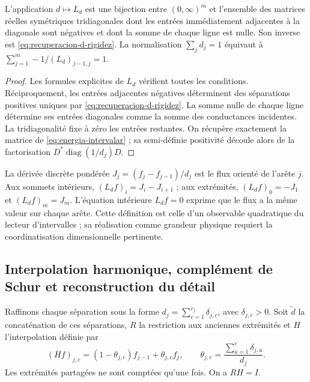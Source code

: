 \begin{proposition}
\label{prop:energia-bidireccional}
L'application \(d\mapsto L_d\) est une bijection entre \((0,\infty)^m\) et l'ensemble des matrices réelles symétriques tridiagonales dont les entrées immédiatement adjacentes à la diagonale sont négatives et dont la somme de chaque ligne est nulle. Son inverse est \eqref{eq:recuperacion-d-rigidez}. La normalisation \(\sum_jd_j=1\) équivaut à \(\sum_{j=1}^m-1/(L_d)_{j-1,j}=1\).
\end{proposition}
\begin{proof}
Les formules explicites de \(L_d\) vérifient toutes les conditions.
Réciproquement, les entrées adjacentes négatives déterminent des séparations
positives uniques par \eqref{eq:recuperacion-d-rigidez}. La somme nulle de
chaque ligne détermine ses entrées diagonales comme la somme des
conductances incidentes. La tridiagonalité fixe à zéro les entrées
restantes. On récupère exactement la matrice de
\eqref{eq:energia-intervalar} ; sa semi-définie positivité découle alors
de la factorisation \(D^*\operatorname{diag}(1/d_j)D\).
\end{proof}

La dérivée discrète pondérée \(J_j=(f_j-f_{j-1})/d_j\) est le flux orienté de l'arête \(j\). Aux sommets intérieurs, \((L_df)_i=J_i-J_{i+1}\) ; aux extrémités, \((L_df)_0=-J_1\) et \((L_df)_m=J_m\). L'équation intérieure \(L_df=0\) exprime que le flux a la même valeur sur chaque arête. Cette définition est celle d'un observable quadratique du lecteur d'intervalles ; sa réalisation comme grandeur physique requiert la coordinatisation dimensionnelle pertinente.

\subsection{Interpolation harmonique, complément de Schur et reconstruction du détail}

Raffinons chaque séparation sous la forme \(d_j=\sum_{c=1}^{r_j}\delta_{j,c}\), avec \(\delta_{j,c}>0\). Soit \(\widetilde d\) la concaténation de ces séparations, \(R\) la restriction aux anciennes extrémités et \(H\) l'interpolation définie par
\begin{equation}
 (Hf)_{j,c}=(1-\theta_{j,c})f_{j-1}+\theta_{j,c}f_j,
 \qquad
 \theta_{j,c}=\frac{\sum_{a=1}^c\delta_{j,a}}{d_j}.
 \label{eq:interpolacion-armonica-k}
\end{equation}
Les extrémités partagées ne sont comptées qu’une fois. On a \(RH=I\).

